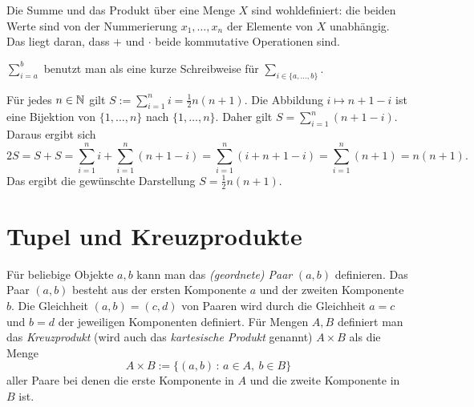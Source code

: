 \begin{bem} 
	Die Summe und das Produkt über eine Menge $X$ sind wohldefiniert: die beiden Werte sind von der Nummerierung $x_1,\ldots,x_n$ der Elemente von $X$ unabhängig. Das liegt daran, dass $+$ und $\cdot$ beide kommutative Operationen sind. 
\end{bem} 


\begin{bem}
	$\sum\limits_{i=a}^b$ benutzt man als eine kurze Schreibweise für $\sum\limits_{i \in \{a,\ldots,b\}}$. 
\end{bem} 

\begin{bsp}
	Für jedes $n \in \mathbb{N}$ gilt $S:=\sum_{i=1}^n i = \frac{1}{2} n (n+1).$ Die Abbildung $i \mapsto n+1 - i$ ist eine Bijektion von $\{1,\ldots,n\}$ nach $\{1,\ldots,n\}$. Daher gilt  $S = \sum_{i=1}^n (n+1 - i)$. Daraus ergibt sich 
	\[
		2 S = S +  S = \sum_{i=1}^n i + \sum_{i=1}^n (n+1 - i) = \sum_{i=1}^n ( i + n + 1 -i) = \sum_{i=1}^n (n+1) = n (n+1). 
	\]
	Das ergibt die gewünschte Darstellung $S = \frac{1}{2} n (n+1)$. 
\end{bsp} 


\section{Tupel und Kreuzprodukte}

\begin{defn} 
Für beliebige Objekte $ a,b $ kann man das \emph{(geordnete) Paar} $ (a,b) $ definieren. Das Paar $(a,b)$ besteht aus der ersten Komponente $a$ und der zweiten Komponente $b$. 
Die Gleichheit $ (a,b) = (c,d) $ von Paaren wird durch die Gleichheit $ a=c $ und $ b=d $ der jeweiligen Komponenten definiert.  Für Mengen $ A,B $ definiert man das \emph{Kreuzprodukt} (wird auch das \emph{kartesische Produkt} genannt) $ A \times B $ als die Menge
\[
A \times B := \{ (a,b) \,:\, a \in A, \ b \in B \}
\]
aller Paare bei denen die erste Komponente in $A$ und die zweite Komponente in $B$ ist. 
\end{defn} 

